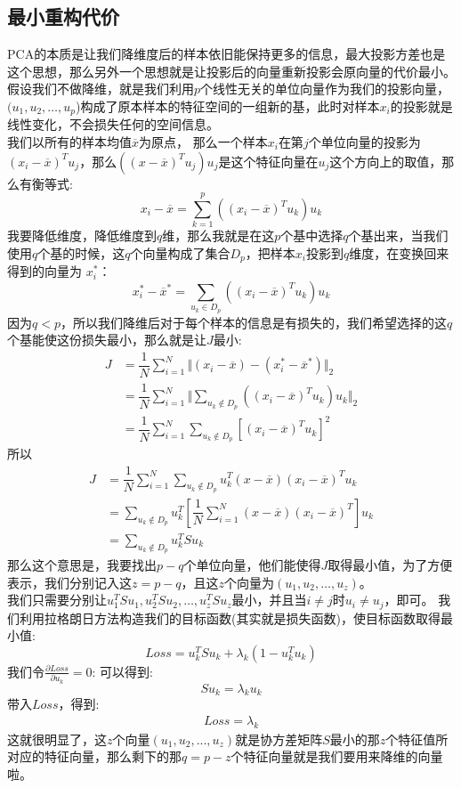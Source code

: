 \documentclass[withoutpreface,bwprint]{cumcmthesis} %
\begin{document}
	\subsection{\Large 最小重构代价}
	PCA的本质是让我们降维度后的样本依旧能保持更多的信息，最大投影方差也是这个思想，那么另外一个思想就是让投影后的向量重新投影会原向量的代价最小。
	假设我们不做降维，就是我们利用$p$个线性无关的单位向量作为我们的投影向量，$(u_1,u_2,\ldots,u_p$)构成了原本样本的特征空间的一组新的基，此时对样本$x_i$的投影就是线性变化，不会损失任何的空间信息。\\
	我们以所有的样本均值$\overline{x}$为原点，
	那么一个样本$x_i$在第$j$个单位向量的投影为$(x_i-\overline{x})^Tu_j$，那么$((x-\overline{x})^Tu_j)u_j$是这个特征向量在$u_j$这个方向上的取值，那么有衡等式:
	\begin{equation}
		x_i-\overline{x}=\sum_{k=1}^{p}((x_i-\overline{x})^Tu_k)u_k
	\end{equation}
	我要降低维度，降低维度到$q$维，那么我就是在这$p$个基中选择$q$个基出来，当我们使用$q$个基的时候，这$q$个向量构成了集合$D_p$，把样本$x_i$投影到$q$维度，在变换回来得到的向量为
	$x_i^*$：
	\begin{equation}
		x_i^*-\overline{x}^*=\sum_{u_k \in D_p} ((x_i-\overline{x})^Tu_k)u_k
	\end{equation}
	因为$q<p$，所以我们降维后对于每个样本的信息是有损失的，我们希望选择的这$q$个基能使这份损失最小，那么就是让$J$最小:
	\begin{align*}
		J
		&=\dfrac{1}{N} \sum_{i=1}^{N}\Vert (x_i-\overline{x})- (x_i^*-\overline{x}^*)\Vert_2\\
		&=\dfrac{1}{N} \sum_{i=1}^{N} \Vert \sum_{u_k \notin D_p } ((x_i-\overline{x})^Tu_k)u_k  \Vert_2 \\
		&=\dfrac{1}{N} \sum_{i=1}^{N}  \sum_{u_k \notin D_p } \left[(x_i-\overline{x})^Tu_k \right]^2
	\end{align*}
	所以
	\begin{align*}
		J
		&=\dfrac{1}{N} \sum_{i=1}^{N}  \sum_{u_k \notin D_p }  u_k^T(x-\overline{x})(x_i-\overline{x})^Tu_k \\
		&= \sum_{u_k \notin D_p } u_k^T\left[ \dfrac{1}{N} \sum_{i=1}^{N} (x-\overline{x})(x_i-\overline{x})^T \right]u_k\\
		&= \sum_{u_k \notin D_p } u_k^T S u_k
	\end{align*}
	那么这个意思是，我要找出$p-q$个单位向量，他们能使得$J$取得最小值，为了方便表示，我们分别记入这$z=p-q$，且这$z$个向量为$(u_1,u_2,\ldots,u_z)$。\\
	我们只需要分别让$u_1^TSu_1,u_2^TSu_2,\ldots,u_z^TSu_z$最小，并且当$i \neq j$时$u_i \neq u_j$，即可。
	我们利用拉格朗日方法构造我们的目标函数(其实就是损失函数)，使目标函数取得最小值:
	\begin{equation}
		Loss= u_k^TSu_k+\lambda_k(1-u_k^Tu_k)
	\end{equation}
	我们令$\frac{\partial Loss}{\partial u_k}=0$:
	可以得到:
	\begin{equation}
		Su_k=\lambda_ku_k
	\end{equation}
	带入$Loss$，得到:
	\begin{align}
		Loss=\lambda_k
	\end{align}
	这就很明显了，这$z$个向量$(u_1,u_2,...,u_z)$就是协方差矩阵$S$最小的那$z$个特征值所对应的特征向量，那么剩下的那$q=p-z$个特征向量就是我们要用来降维的向量啦。
\end{document}
